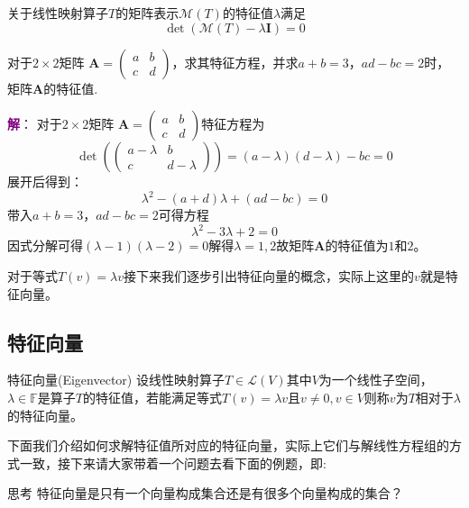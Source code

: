 \begin{corollary}
	关于线性映射算子$T$的矩阵表示$\mathcal{M}(T)$的特征值$\lambda$满足$$\det(\mathcal{M}(T) - \lambda \mathbf{I}) = 0$$
\end{corollary}

\begin{example}
	对于$2\times 2$矩阵 $ \mathbf{A} = \begin{pmatrix} a & b \\ c & d \end{pmatrix} $，求其特征方程，并求$a+b=3$，$ad-bc=2$时，矩阵$\mathbf{A}$的特征值.

	\tcblower
	\textcolor{purple}{\textbf{解}}： 对于$2\times 2$矩阵 $ \mathbf{A} = \begin{pmatrix} a & b \\ c & d \end{pmatrix} $特征方程为$$\det\left( \begin{pmatrix} a-\lambda & b \\ c & d-\lambda \end{pmatrix} \right) = (a-\lambda)(d-\lambda) - bc = 0$$展开后得到：$$\lambda^2 - (a+d)\lambda + (ad - bc) = 0$$带入$a+b=3$，$ad-bc=2$可得方程$$\lambda^2 - 3\lambda + 2 = 0$$因式分解可得$(\lambda-1)(\lambda-2)=0$解得$\lambda=1,2$故矩阵$\mathbf{A}$的特征值为$1$和$2$。
\end{example}

对于等式$T(v)=\lambda v$接下来我们逐步引出特征向量的概念，实际上这里的$v$就是特征向量。

\subsection{特征向量}

\begin{definition}{特征向量(Eigenvector)}
	设线性映射算子$T\in\mathcal{L}(V)$其中$V$为一个线性子空间，$\lambda \in \mathbb{F}$是算子$T$的特征值，若能满足等式$T(v)=\lambda v$且$v\neq 0,v\in V$则称$v$为$T$相对于$\lambda$的特征向量。
\end{definition}

下面我们介绍如何求解特征值所对应的特征向量，实际上它们与解线性方程组的方式一致，接下来请大家带着一个问题去看下面的例题，即:

\begin{ascolorbox1}{思考}
	特征向量是只有一个向量构成集合还是有很多个向量构成的集合？
\end{ascolorbox1}

